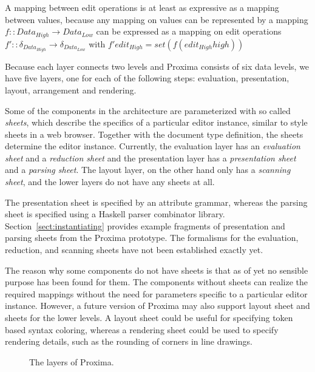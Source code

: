 \documentclass{speauth}
\begin{document}
A mapping between edit operations is at least as expressive as a mapping between values, because any 
mapping on values can be represented by a mapping 
$f :: Data_{High} \rightarrow Data_{Low}$ can be expressed as a mapping on edit operations
$f' ::  \delta_{Data_{High}} \rightarrow \delta_{Data_{Low}}$ with $f' edit_{High} = set (f (edit_{High}high))$
\ec




Because each layer connects two levels and Proxima  consists of six data levels, we have five layers, one for each of the following steps: evaluation, presentation, layout, arrangement and rendering.

Some of the components in the architecture are parameterized with so called {\em sheets}, which describe the specifics of a particular editor instance, similar to style sheets in a web browser. Together with the document type definition, the sheets determine the editor instance. Currently, the evaluation layer has an {\em evaluation sheet} and a {\em reduction sheet} and the presentation layer has a {\em presentation sheet} and a {\em parsing sheet}.  The layout layer, on the other hand only has a {\em scanning sheet}, and the lower layers do not have any sheets at all. 

The presentation sheet is specified by an attribute grammar, whereas the parsing sheet is specified using a Haskell parser combinator library. Section~\ref{sect:instantiating} provides example fragments of presentation and parsing sheets from the Proxima prototype. The formalisms for the evaluation, reduction, and scanning sheets have not been established exactly yet.

The reason why some components do not have sheets is that as of yet no sensible purpose has been found for them. The components without sheets can realize the required mappings without the need for parameters specific to a particular editor instance. However, a future version of Proxima may also support layout sheet and sheets for the lower levels. A layout sheet could be useful for specifying token based syntax coloring, whereas a rendering sheet could be used to specify rendering details, such as the rounding of corners in line drawings.

\begin{figure}
\begin{small}
\begin{center}
\begin{center}
\end{center}\caption{The layers of Proxima.}\label{proxLayers} 
\end{center}
\end{small}
\end{figure}
\end{document}
